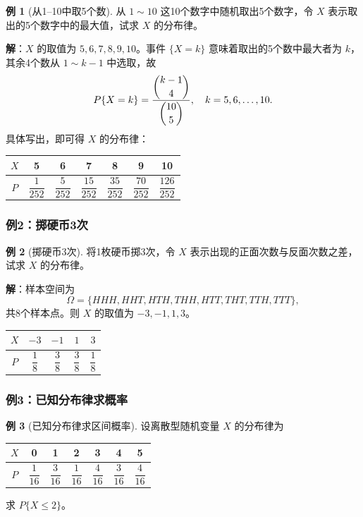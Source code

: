\documentclass[11pt,a4paper]{report}
\theoremstyle{definition}
\newtheorem{example}{例}[chapter]
\begin{document}
\begin{example}[从1--10中取5个数]
从 $1 \sim 10$ 这10个数字中随机取出5个数字，令 $X$ 表示取出的5个数字中的最大值，试求 $X$ 的分布律。
\end{example}

\textbf{解}：$X$ 的取值为 $5,6,7,8,9,10$。事件 $\{X=k\}$ 意味着取出的5个数中最大者为 $k$，其余4个数从 $1 \sim k-1$ 中选取，故
\[
P\{X=k\} = \frac{\dbinom{k-1}{4}}{\dbinom{10}{5}}, \quad k=5,6,\dots,10.
\]
具体写出，即可得 $X$ 的分布律：

\begin{table}[htbp]
\centering
\begin{tabular}{@{}ccccccc@{}}
\toprule
$X$ & 5 & 6 & 7 & 8 & 9 & 10 \\
\midrule
$P$ & $\dfrac{1}{252}$ & $\dfrac{5}{252}$ & $\dfrac{15}{252}$ & $\dfrac{35}{252}$ & $\dfrac{70}{252}$ & $\dfrac{126}{252}$ \\
\bottomrule
\end{tabular}
\end{table}

\subsubsection{例2：掷硬币3次}

\begin{example}[掷硬币3次]
将1枚硬币掷3次，令 $X$ 表示出现的正面次数与反面次数之差，试求 $X$ 的分布律。
\end{example}

\textbf{解}：样本空间为
\[
\Omega = \{HHH, HHT, HTH, THH, HTT, THT, TTH, TTT\},
\]
共8个样本点。则 $X$ 的取值为 $-3,-1,1,3$。

\begin{table}[htbp]
\centering
\begin{tabular}{@{}ccccc@{}}
\toprule
$X$ & $-3$ & $-1$ & $1$ & $3$ \\
\midrule
$P$ & $\dfrac{1}{8}$ & $\dfrac{3}{8}$ & $\dfrac{3}{8}$ & $\dfrac{1}{8}$ \\
\bottomrule
\end{tabular}
\end{table}

\subsubsection{例3：已知分布律求概率}

\begin{example}[已知分布律求区间概率]
设离散型随机变量 $X$ 的分布律为
\begin{table}[htbp]
\centering
\begin{tabular}{@{}ccccccc@{}}
\toprule
$X$ & 0 & 1 & 2 & 3 & 4 & 5 \\
\midrule
$P$ & $\dfrac{1}{16}$ & $\dfrac{3}{16}$ & $\dfrac{1}{16}$ & $\dfrac{4}{16}$ & $\dfrac{3}{16}$ & $\dfrac{4}{16}$ \\
\bottomrule
\end{tabular}
\end{table}
求 $P\{X \leq 2\}$。
\end{example}
\end{document}
